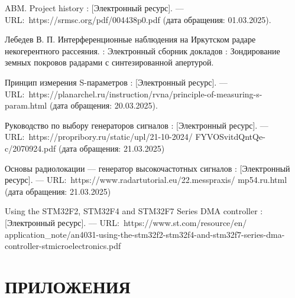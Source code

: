 \documentclass{report}
\begin{document}
\begin{thebibliography}{}

 ABM. Project history : [Электронный ресурс]. --– URL:~https://srmsc.org/pdf/004438p0.pdf (дата обращения: 01.03.2025).

  Лебедев В. П. Интерференционные наблюдения на Иркутском радаре некогерентного рассеяния. : Электронный сборник докладов : Зондирование земных покровов радарами с синтезированной апертурой.

 Принцип измерения S-параметров : [Электронный ресурс]. --– URL:~https://planarchel.ru/instruction/rvna/principle-of-measuring-s-param.html (дата обращения: 20.03.2025).

 Руководство по выбору генераторов сигналов : [Электронный ресурс]. --– URL:~https://propribory.ru/static/upl/21-10-2024/ FYVOSvitdQntQe-c/2070924.pdf (дата обращения: 21.03.2025)

 Основы радиолокации --- генератор высокочастотных сигналов : [Электронный ресурс]. --– URL:~https://www.radartutorial.eu/22.messpraxis/ mp54.ru.html (дата обращения: 21.03.2025)

 Using the STM32F2, STM32F4 and STM32F7 Series DMA controller : [Электронный ресурс]. --– URL:~https://www.st.com/resource/en/
application\_note/an4031-using-the-stm32f2-stm32f4-and-stm32f7-series-dma-
controller-stmicroelectronics.pdf

\end{thebibliography}


\chapter*{ПРИЛОЖЕНИЯ}

\end{document}
